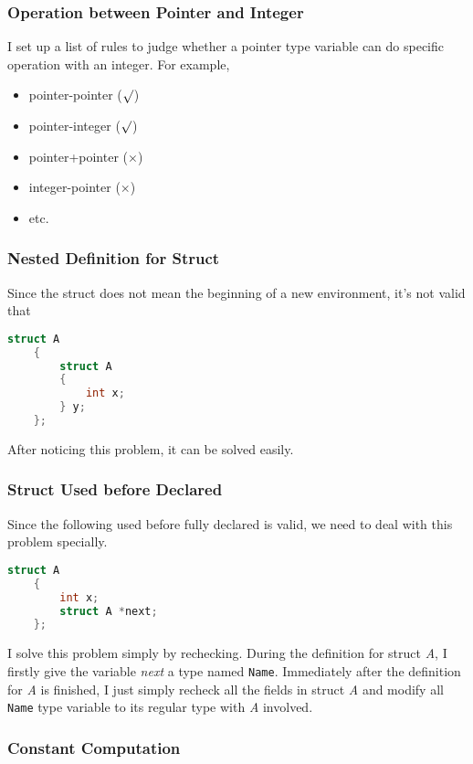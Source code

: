 \documentclass[journal]{IEEEtran}
\begin{document}
\subsubsection{Operation between Pointer and Integer}

I set up a list of rules to judge whether a pointer type variable can do specific operation with an integer. For example,
\begin{itemize}
\item pointer-pointer ($\surd$)
\item pointer-integer ($\surd$)
\item pointer+pointer ($\times$)
\item integer-pointer ($\times$)
\item etc.
\end{itemize}

\subsubsection{Nested Definition for Struct}

Since the struct does not mean the beginning of a new environment, it's not valid that
\begin{lstlisting}[language=c]
	struct A
	{
		struct A
		{
			int x;
		} y;
	};
\end{lstlisting}
After noticing this problem, it can be solved easily.

\subsubsection{Struct Used before Declared}

Since the following used before fully declared is valid, we need to deal with this problem specially.
\begin{lstlisting}[language=c]
	struct A
	{
		int x;
		struct A *next;
	};
\end{lstlisting}
I solve this problem simply by rechecking. During the definition for struct \textit{A}, I firstly give the variable \textit{next} a type named \texttt{Name}. Immediately after the definition for \textit{A} is finished, I just simply recheck all the fields in struct \textit{A} and modify all \texttt{Name} type variable to its regular type with \textit{A} involved.

\subsubsection{Constant Computation}
\end{document}
